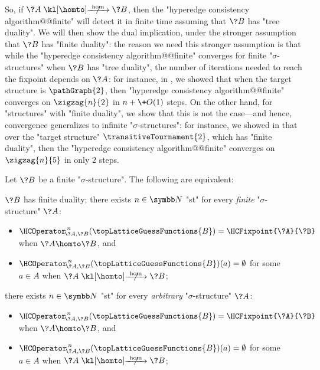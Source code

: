 So, if $\?A \nothomto \?B$, then the "hyperedge consistency algorithm@@finite" will detect it in finite time assuming 
that $\?B$ has "tree duality".
We will then show the dual implication, under the stronger assumption that $\?B$ has "finite 
duality": the reason we need this stronger assumption is that while the "hyperedge consistency algorithm@@finite" converges for finite "$\sigma$-structures" when $\?B$ has "tree duality",
the number of iterations needed to reach the fixpoint depends on $\?A$:
for instance, in , we showed that when the target structure
is $\pathGraph{2}$, then "hyperedge consistency algorithm@@finite" converges
on $\zigzag{n}{2}$ in $n + \+O(1)$ steps.
On the other hand, for "structures"
with "finite duality", we show that this is not the case---and hence, convergence generalizes to 
infinite "$\sigma$-structures": for instance, we showed in 
that over the "target structure" $\transitiveTournament{2}$, which has "finite duality", 
then the "hyperedge consistency algorithm@@finite" converges
on $\zigzag{n}{5}$ in only $2$ steps.

\begin{lemma}
	\AP\label{lem:hyperedge-consistency-uniform-convergence}
	Let $\?B$ be a finite "$\sigma$-structure".
	The following are equivalent:
	\begin{enumerate}
		\itemAP\label{item:hc-uniform-finite-duality}%
			$\?B$ has finite duality;
		\itemAP\label{item:hc-uniform-finite-structures}%
			there exists $n\in\N$ "st" for every \emph{finite} "$\sigma$-structure" $\?A$:
			\begin{itemize}
				\item $\HCOperator^{\,n}_{\!\?A,\?B}(\topLatticeGuessFunctions{B})
					= \HCFixpoint{\?A}{\?B}$ when $\?A \homto \?B$, and
				\item $\HCOperator^{\,n}_{\!\?A,\?B}(\topLatticeGuessFunctions{B})(a) = \emptyset$ for some $a\in A$ when $\?A \nothomto \?B$;
			\end{itemize}
		\itemAP\label{item:hc-uniform-arbitrary-structures}%
			there exists $n\in\N$ "st" for every \emph{arbitrary} "$\sigma$-structure" $\?A$:
			\begin{itemize}
				\item $\HCOperator^{\,n}_{\!\?A,\?B}(\topLatticeGuessFunctions{B})
					= \HCFixpoint{\?A}{\?B}$ when $\?A \homto \?B$, and
				\item $\HCOperator^{\,n}_{\!\?A,\?B}(\topLatticeGuessFunctions{B})(a) = \emptyset$ for some $a\in A$ when $\?A \nothomto \?B$;
			\end{itemize}
	\end{enumerate}
\end{lemma}

